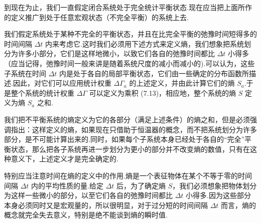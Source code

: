 到现在为止，我们一直假定闭合系统处于完全统计平衡状态.现在应当把上面所作的定义推广到处于任意宏观状态（不完全平衡）的系统上去.

我们假定系统处于某种不完全的平衡状态，并且在比完全平衡的弛豫时间短得多的时间间隔 $\Delta t$ 内来考虑它.这时我们必须用下述方式来定义熵，我们想象把系统划分为许多小部分，它们是这样地微小，以致它们各自的弛豫时间都比 $\Delta t$ 小得多（应当记得，弛豫时间一般来讲是随着系统尺度的减小而减小的).可以认为，这些子系统在时间 $\Delta t$ 内是处于各自的局部平衡状态，它们由一些确定的分布函数所描述.因此，对它们可以应用统计权重 $\Delta\Gamma_a$ 的上述定义，并由此计算它们的熵 $S_a$.于是整个系统的统计权重 $\Delta\Gamma$ 可以定义为乘积 (7.13)，相应地，整个系统的熵 $S$ 定义为熵 $S_a$ 之和.

我们把不平衡系统的熵定义为它的各部分（满足上述条件）的熵之和，但是必须强调指出：这样定义的熵，如果现在只借助于恒温器的概念，而不把系统划分为许多部分，是不可能计算出来的.同时，如果每个子系统本身已经处于各自的“完全”平衡状态，那么把各子系统再进一步划分为更小的部分并不改变熵的数值，只有在这种意义下，上述定义才是完全确定的.

特别应当注意时间在熵的定义中的作用.熵是一个表征物体在某个不等于零的时间间隔 $\Delta t$ 内的平均性质的量.给定 $\Delta t$ 后，为了确定熵 $S$，我们必须想象把物体划分为这样一些微小的部分，以至它们各自的弛豫时间都比 $\Delta t$ 小得多.因为这些部分本身必须同时又是宏观量的，所以很明显，对于过分短的时间间隔 $\Delta t$ 而言，熵的概念就完全失去意义，特别是绝不能谈到熵的瞬时值.

